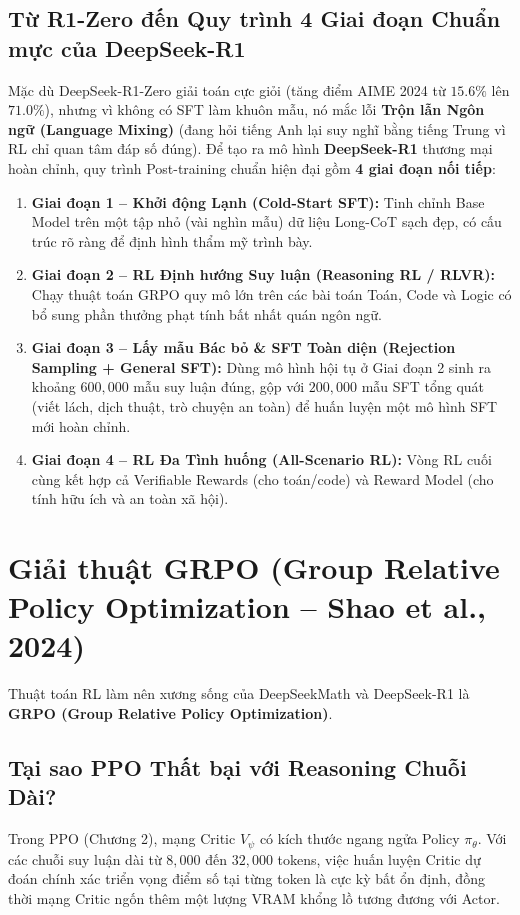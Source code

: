 \subsection{Từ R1-Zero đến Quy trình 4 Giai đoạn Chuẩn mực của DeepSeek-R1}
Mặc dù DeepSeek-R1-Zero giải toán cực giỏi (tăng điểm AIME 2024 từ $15.6\%$ lên $71.0\%$), nhưng vì không có SFT làm khuôn mẫu, nó mắc lỗi \textbf{Trộn lẫn Ngôn ngữ (Language Mixing)} (đang hỏi tiếng Anh lại suy nghĩ bằng tiếng Trung vì RL chỉ quan tâm đáp số đúng).
Để tạo ra mô hình \textbf{DeepSeek-R1} thương mại hoàn chỉnh, quy trình Post-training chuẩn hiện đại gồm \textbf{4 giai đoạn nối tiếp}:
\begin{enumerate}[leftmargin=1.2cm]
    \item \textbf{Giai đoạn 1 -- Khởi động Lạnh (Cold-Start SFT):} Tinh chỉnh Base Model trên một tập nhỏ (vài nghìn mẫu) dữ liệu Long-CoT sạch đẹp, có cấu trúc rõ ràng để định hình thẩm mỹ trình bày.
    \item \textbf{Giai đoạn 2 -- RL Định hướng Suy luận (Reasoning RL / RLVR):} Chạy thuật toán GRPO quy mô lớn trên các bài toán Toán, Code và Logic có bổ sung phần thưởng phạt tính bất nhất quán ngôn ngữ.
    \item \textbf{Giai đoạn 3 -- Lấy mẫu Bác bỏ \& SFT Toàn diện (Rejection Sampling + General SFT):} Dùng mô hình hội tụ ở Giai đoạn 2 sinh ra khoảng $600,000$ mẫu suy luận đúng, gộp với $200,000$ mẫu SFT tổng quát (viết lách, dịch thuật, trò chuyện an toàn) để huấn luyện một mô hình SFT mới hoàn chỉnh.
    \item \textbf{Giai đoạn 4 -- RL Đa Tình huống (All-Scenario RL):} Vòng RL cuối cùng kết hợp cả Verifiable Rewards (cho toán/code) và Reward Model (cho tính hữu ích và an toàn xã hội).
\end{enumerate}

\section{Giải thuật GRPO (Group Relative Policy Optimization -- Shao et al., 2024)}
\label{sec:grpo_algorithm}

Thuật toán RL làm nên xương sống của DeepSeekMath \citep{shao2024deepseekmath} và DeepSeek-R1 \citep{deepseek2025r1} là \textbf{GRPO (Group Relative Policy Optimization)}.

\subsection{Tại sao PPO Thất bại với Reasoning Chuỗi Dài?}
Trong PPO (Chương 2), mạng Critic $V_\psi$ có kích thước ngang ngửa Policy $\pi_\theta$. Với các chuỗi suy luận dài từ $8,000$ đến $32,000$ tokens, việc huấn luyện Critic dự đoán chính xác triển vọng điểm số tại từng token là cực kỳ bất ổn định, đồng thời mạng Critic ngốn thêm một lượng VRAM khổng lồ tương đương với Actor.

